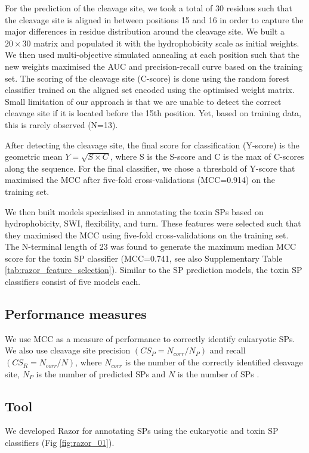 For the prediction of the cleavage site, we took a total of 30 residues such that the cleavage site is aligned in between positions 15 and 16 in order to capture the major differences in residue distribution around the cleavage site. We built a $20\times30$ matrix and populated it with the hydrophobicity scale \cite{Kyte1982-qn} as initial weights. We then used multi-objective simulated annealing \cite{Kirkpatrick1983-hh} at each position such that the new weights maximised the AUC and precision-recall curve based on the training set. The scoring of the cleavage site (C-score) is done using the random forest classifier trained on the aligned set encoded using the optimised weight matrix. Small limitation of our approach is that we are unable to detect the correct cleavage site if it is located before the 15th position. Yet, based on training data, this is rarely observed (N=13).

After detecting the cleavage site, the final score for classification (Y-score) is the geometric mean $Y = \sqrt{S \times C} $, where S is the S-score and C is the max of C-scores along the sequence. For the final classifier, we chose a threshold of Y-score that maximised the MCC after five-fold cross-validations (MCC=0.914) on the training set.

We then built models specialised in annotating the toxin SPs based on hydrophobicity, SWI, flexibility, and turn. These features were selected such that they maximised the MCC using five-fold cross-validations on the training set. The N-terminal length of 23 was found to generate the maximum median MCC score for the toxin SP classifier (MCC=0.741, see also Supplementary Table \ref{tab:razor_feature_selection}). Similar to the SP prediction models, the toxin SP classifiers consist of five models each.

\subsection{Performance measures}
We use MCC as a measure of performance to correctly identify eukaryotic SPs. We also use cleavage site precision $(CS_P=N_{corr}/N_P)$ and recall $(CS_R=N_{corr}/N)$, where $N_{corr}$ is the number of the correctly identified cleavage site, $N_P$ is the number of predicted SPs and $N$ is the number of SPs \cite{Almagro_Armenteros2019-vr,Savojardo2017-ux}.

\subsection{Tool}
We developed Razor for annotating SPs using the eukaryotic and toxin SP classifiers (Fig \ref{fig:razor_01}).


